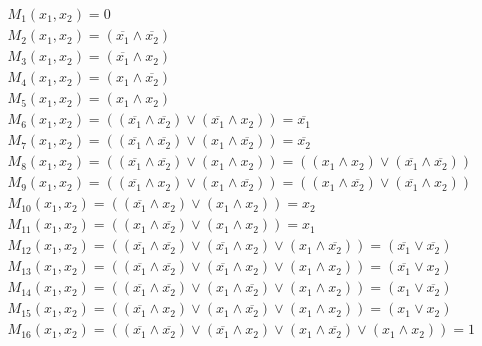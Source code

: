 \begin{doublespace}
\noindent\(\begin{array}{l}
 M_1\left(x_1,x_2\right)=0 \\
 M_2\left(x_1,x_2\right)=\left(\overline{x_1}\land \overline{x_2}\right) \\
 M_3\left(x_1,x_2\right)=\left(\overline{x_1}\land x_2\right) \\
 M_4\left(x_1,x_2\right)=\left(x_1\land \overline{x_2}\right) \\
 M_5\left(x_1,x_2\right)=\left(x_1\land x_2\right) \\
 M_6\left(x_1,x_2\right)=\left(\left(\overline{x_1}\land \overline{x_2}\right)\lor \left(\overline{x_1}\land x_2\right)\right)=\overline{x_1} \\
 M_7\left(x_1,x_2\right)=\left(\left(\overline{x_1}\land \overline{x_2}\right)\lor \left(x_1\land \overline{x_2}\right)\right)=\overline{x_2} \\
 M_8\left(x_1,x_2\right)=\left(\left(\overline{x_1}\land \overline{x_2}\right)\lor \left(x_1\land x_2\right)\right)=\left(\left(x_1\land x_2\right)\lor
\left(\overline{x_1}\land \overline{x_2}\right)\right) \\
 M_9\left(x_1,x_2\right)=\left(\left(\overline{x_1}\land x_2\right)\lor \left(x_1\land \overline{x_2}\right)\right)=\left(\left(x_1\land \overline{x_2}\right)\lor
\left(\overline{x_1}\land x_2\right)\right) \\
 M_{10}\left(x_1,x_2\right)=\left(\left(\overline{x_1}\land x_2\right)\lor \left(x_1\land x_2\right)\right)=x_2 \\
 M_{11}\left(x_1,x_2\right)=\left(\left(x_1\land \overline{x_2}\right)\lor \left(x_1\land x_2\right)\right)=x_1 \\
 M_{12}\left(x_1,x_2\right)=\left(\left(\overline{x_1}\land \overline{x_2}\right)\lor \left(\overline{x_1}\land x_2\right)\lor \left(x_1\land \overline{x_2}\right)\right)=\left(\overline{x_1}\lor
\overline{x_2}\right) \\
 M_{13}\left(x_1,x_2\right)=\left(\left(\overline{x_1}\land \overline{x_2}\right)\lor \left(\overline{x_1}\land x_2\right)\lor \left(x_1\land x_2\right)\right)=\left(\overline{x_1}\lor
x_2\right) \\
 M_{14}\left(x_1,x_2\right)=\left(\left(\overline{x_1}\land \overline{x_2}\right)\lor \left(x_1\land \overline{x_2}\right)\lor \left(x_1\land x_2\right)\right)=\left(x_1\lor
\overline{x_2}\right) \\
 M_{15}\left(x_1,x_2\right)=\left(\left(\overline{x_1}\land x_2\right)\lor \left(x_1\land \overline{x_2}\right)\lor \left(x_1\land x_2\right)\right)=\left(x_1\lor
x_2\right) \\
 M_{16}\left(x_1,x_2\right)=\left(\left(\overline{x_1}\land \overline{x_2}\right)\lor \left(\overline{x_1}\land x_2\right)\lor \left(x_1\land \overline{x_2}\right)\lor
\left(x_1\land x_2\right)\right)=1 \\
\end{array}\)
\end{doublespace}

